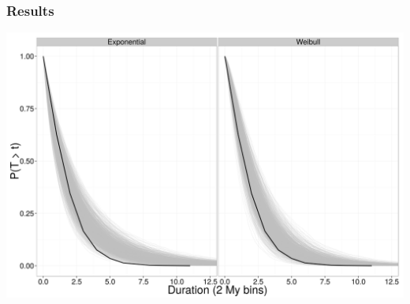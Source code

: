 \documentclass{beamer}
\begin{document}
\begin{frame}
  \frametitle{Results}
  \includegraphics[width=\textwidth,height=0.8\textheight,keepaspectratio=true]{figure/survival_function}
  
  \tiny{}
\end{frame}
\end{document}
